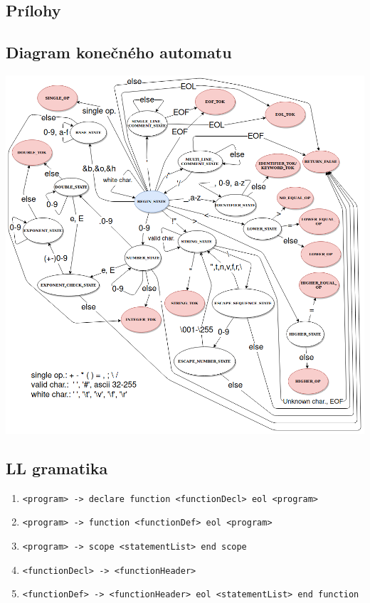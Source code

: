 \documentclass{article}
\begin{document}
\begin{itemize}
    \newpage
    \section{Prílohy}
        \subsection{Diagram konečného automatu}
            \includegraphics[trim=6cm 0 0 0, width=15cm]{finite_automata.png}
            \newpage
            
        \subsection{LL gramatika}
            \begin{enumerate}
                \item \texttt{<program> -> declare function <functionDecl> eol <program>}
                \item \texttt{<program> -> function <functionDef> eol <program>}
                \item \texttt{<program> -> scope <statementList> end scope}
                
                \item \texttt{<functionDecl> -> <functionHeader>}
                \item \texttt{<functionDef> -> <functionHeader> eol <statementList> end function}
                

\end{enumerate}
\end{itemize}
\end{document}
